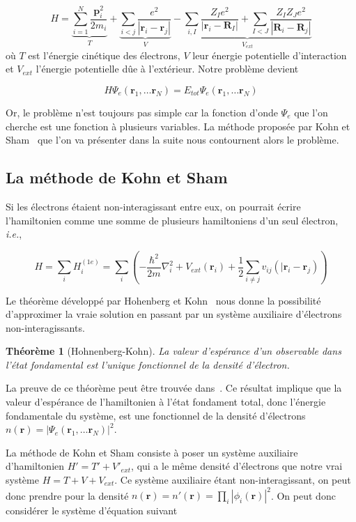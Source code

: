 \documentclass[12pt, french]{report}
\theoremstyle{theoreme}
\newtheorem{theoreme}{Théorème}
\begin{document}
$$
H = \underbrace{\sum_{i=1}^N \frac{\textbf{p}_i^2}{2m_i}}_{T}
+ \underbrace{\sum_{i<j}\frac{e^2}{| \textbf{r}_i - \textbf{r}_j |}}_{V}
- \underbrace{\sum_{i, I}\frac{Z_I e^2}{| \textbf{r}_i - \textbf{R}_I |} + \sum_{I<J}\frac{Z_I Z_J e^2}{| \textbf{R}_i - \textbf{R}_j |}}_{V_{ext}}
$$
où $T$ est l'énergie cinétique des électrons, $V$ leur énergie potentielle d'interaction et $V_{ext}$ l'énergie potentielle dûe à l'extérieur.
Notre problème devient

$$
H \Psi_e(\textbf{r}_1, \ldots \textbf{r}_N) = E_{tot} \Psi_e(\textbf{r}_1, \ldots \textbf{r}_N)
$$

Or, le problème n'est toujours pas simple car la fonction d'onde $\Psi_e$ que l'on cherche est une fonction à plusieurs variables. La méthode proposée par Kohn et Sham~\cite{Koh65} que l'on va présenter dans la suite nous contournent alors le problème.

\subsection{La méthode de Kohn et Sham}
\label{subsec-KS}
Si les électrons étaient non-interagissant entre eux, on pourrait écrire l'hamiltonien comme une somme de plusieurs hamiltoniens d'un seul électron, \textit{i.e.},

$$
H = \sum_i H_i^{(1e)} = \sum_i (-\frac{\hbar^2}{2m}\nabla_i^2 + V_{ext}(\textbf{r}_i) + \frac{1}{2}\sum_{i \neq j} v_{ij}(|\textbf{r}_i - \textbf{r}_j))
$$

Le théorème développé par Hohenberg et Kohn~\cite{Hoh64} nous donne la possibilité d'approximer la vraie solution en passant par un système auxiliaire d'électrons non-interagissants.

\begin{theoreme}[Hohnenberg-Kohn]
  La valeur d'espérance d'un observable dans l'état fondamental est l'unique fonctionnel de la densité d'électron.
\end{theoreme}

La preuve de ce théorème peut être trouvée dans~\cite{Sot03}.
Ce résultat implique que la valeur d'espérance de l'hamiltonien à l'état fondament total, donc l'énergie fondamentale du système, est une fonctionnel de la densité d'électrons $n(\textbf{r}) = |\Psi_e(\textbf{r}_1, \ldots \textbf{r}_N) |^2$.

La méthode de Kohn et Sham consiste à poser un système auxiliaire d'hamiltonien $H' = T' + V'_{ext}$, qui a le même densité d'électrons que notre vrai système $H = T + V + V_{ext}$. Ce système auxiliaire étant non-interagissant, on peut donc prendre pour la densité $n(\textbf{r}) = n'(\textbf{r}) = \prod_i |\phi_i(\textbf{r})|^2$. On peut donc considérer le système d'équation suivant
\end{document}
